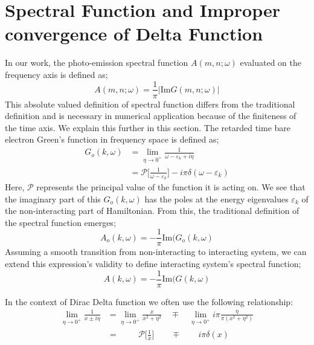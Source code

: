 \documentclass{article}
\begin{document}
\section{Spectral Function and Improper convergence of Delta Function}
In our work, the photo-emission spectral function $A(m,n;\omega)$ evaluated on the frequency axis is defined as;
 \begin{equation*}
     A(m,n;\omega) = \frac{1}{\pi} |\text{Im}G(m,n;\omega)|
 \end{equation*}
 This absolute valued definition of spectral function differs from the traditional definition and is necessary in numerical application because of the finiteness of the time axis. We explain this further in this section. The retarded time bare electron Green's function in frequency space is defined as;
\begin{equation}
\begin{aligned}
    G_o(k,\omega) &= \lim_{\eta\rightarrow0^+}\frac{1}{\omega -\varepsilon_k +i\eta}\\
    & =\mathscr{P}\Big[\frac{1}{\omega-\varepsilon_k} \Big] - i\pi\delta(\omega-\varepsilon_k)
\end{aligned}
\end{equation}
Here, $\mathscr{P}$ represents the principal value of the function it is acting on. We see that the imaginary part of this $G_o(k,\omega)$ has the poles at the energy eigenvalues $\varepsilon_k$ of the non-interacting part of Hamiltonian. From this, the traditional definition of the spectral function emerges;
\begin{equation}
    A_o(k,\omega) = -\frac{1}{\pi} \text{Im}(G_o(k,\omega)
    \label{traditional}
\end{equation}
Assuming a smooth transition from non-interacting to interacting system, we can extend this expression's validity to define interacting system's spectral function;
\begin{equation}
    A(k,\omega) = -\frac{1}{\pi} \text{Im}(G(k,\omega)
\end{equation}

In the context of Dirac Delta function we often use the following relationship:
\begin{equation}
\begin{aligned}
    \lim_{\eta\rightarrow 0^+} \frac{1}{x\pm i \eta} &=\lim_{\eta\rightarrow 0^+} \frac{x}{x^2+ \eta^2} \quad\mp\quad\lim_{\eta\rightarrow 0^+}  i\pi \frac{\eta}{\pi(x^2 + \eta^2)}\\
    & =\qquad \,\,\mathscr{P}\Big[\frac{1}{x} \Big] \qquad\mp\qquad i\pi\delta(x)
\end{aligned}
\end{equation}
\end{document}
